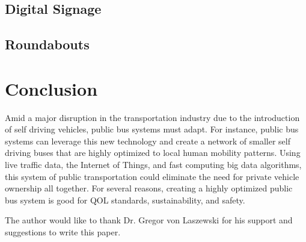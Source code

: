 \documentclass[sigconf]{acmart}
\begin{document}
\subsection{Digital Signage}
\subsection{Roundabouts}

\section{Conclusion}

Amid a major disruption in the transportation industry due to the introduction of self driving vehicles, public bus systems must adapt. For instance, public bus systems can leverage this new technology and create a network of smaller self driving buses that are highly optimized to local human mobility patterns. Using live traffic data, the Internet of Things, and fast computing big data algorithms, this system of public transportation could eliminate the need for private vehicle ownership all together. For several reasons, creating a highly optimized public bus system is good for QOL standards, sustainability, and safety. 

\begin{acks}

The author would like to thank Dr. Gregor von Laszewski for his support and suggestions to write this paper.

\end{acks}


 
\end{document}
